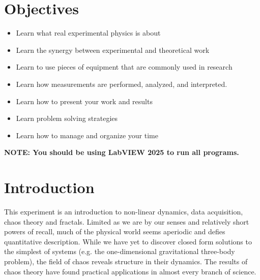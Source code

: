 \documentclass{../lab}
\begin{document}
\section{Objectives}

\begin{itemize}
    \item Learn what real experimental physics is about

    \item Learn the synergy between experimental and theoretical work

    \item Learn to use pieces of equipment that are commonly used in research

    \item Learn how measurements are performed, analyzed, and interpreted.

    \item Learn how to present your work and results

    \item Learn problem solving strategies

    \item Learn how to manage and organize your time
\end{itemize}

\textbf{NOTE: You should be using LabVIEW 2025 to run all programs.}


\section{Introduction}

This experiment is an introduction to non-linear dynamics, data acquisition, chaos theory and fractals. Limited as we are by our senses and relatively short powers of recall, much of the physical world seems aperiodic and defies quantitative description. While we have yet to discover closed form solutions to the simplest of systems (e.g. the one-dimensional gravitational three-body problem), the field of chaos reveals structure in their dynamics. The results of chaos theory have found practical applications in almost every branch of science.
\end{document}
